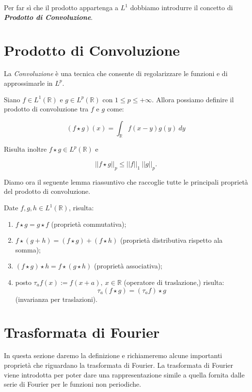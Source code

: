 Per far sì che il prodotto appartenga a $L^1$ dobbiamo introdurre il concetto di
\textit{\textbf{Prodotto di Convoluzione}}.

\section{Prodotto di Convoluzione}

La \textit{Convoluzione} è una tecnica che consente di regolarizzare le funzioni
e di approssimarle in $L^p$.
\begin{definition}
    Siano $f \in L^1(\mathbb{R})$ e $g \in L^p(\mathbb{R})$ con $1 \leq p \leq +\infty$.
    Allora possiamo definire il prodotto di convoluzione tra $f$ e $g$ come:

    $$
        \left( f \star g\right)(x) = \int_{\mathbb{R}} f(x - y) g(y) \ dy
    $$

    Risulta inoltre $f \star g \in L^p(\mathbb{R})$ e

    $$
        ||f \star g||_p \leq ||f||_1 \ ||g||_p.
    $$
\end{definition}

Diamo ora il seguente lemma riassuntivo che raccoglie tutte le principali
proprietà del prodotto di convoluzione.

\begin{lemma}
    Date $f, g, h \in L^1(\mathbb{R})$, risulta:

    \begin{enumerate}
        \item $f \star g = g \star f$ (proprietà commutativa);
        \item $f \star (g + h) = (f \star g) + (f \star h)$ (proprietà distributiva rispetto ala somma);
        \item $(f \star g) \star h = f \star (g \star h)$ (proprietà associativa);
        \item posto $\tau_a f(x) := f(x + a), \ x \in \mathbb{R}$ (operatore di traslazione,)
              risulta:
              $$
                  \tau_a (f \star g) = (\tau_a f) \star g
              $$
              (invarianza per traslazioni).
    \end{enumerate}
\end{lemma}

\section{Trasformata di Fourier}

In questa sezione daremo la definizione e richiameremo alcune importanti
proprietà che riguardano la trasformata di Fourier. La trasformata di Fourier
viene introdotta per poter dare una rappresentazione simile a quella fornita
dalle serie di Fourier per le funzioni non periodiche.

